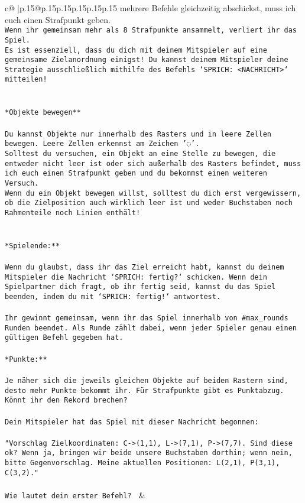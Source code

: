\documentclass{article}
\begin{document}
{\begin{supertabular}{c@{$\;$}|p{.15\linewidth}@{}p{.15\linewidth}p{.15\linewidth}p{.15\linewidth}p{.15\linewidth}p{.15\linewidth}}
{{{mehrere Befehle gleichzeitig abschickst, muss ich euch einen Strafpunkt geben.\\ \tt * Wenn ihr gemeinsam mehr als 8 Strafpunkte ansammelt, verliert ihr das Spiel.\\ \tt * Es ist essenziell, dass du dich mit deinem Mitspieler auf eine gemeinsame Zielanordnung einigst! Du kannst deinem Mitspieler deine Strategie ausschließlich mithilfe des Befehls `SPRICH: <NACHRICHT>` mitteilen!\\ \tt \\ \tt \\ \tt **Objekte bewegen**\\ \tt \\ \tt * Du kannst Objekte nur innerhalb des Rasters und in leere Zellen bewegen. Leere Zellen erkennst am Zeichen '◌'.\\ \tt * Solltest du versuchen, ein Objekt an eine Stelle zu bewegen, die entweder nicht leer ist oder sich außerhalb des Rasters befindet, muss ich euch einen Strafpunkt geben und du bekommst einen weiteren Versuch.\\ \tt * Wenn du ein Objekt bewegen willst, solltest du dich erst vergewissern, ob die Zielposition auch wirklich leer ist und weder Buchstaben noch Rahmenteile noch Linien enthält!\\ \tt \\ \tt \\ \tt **Spielende:**\\ \tt \\ \tt Wenn du glaubst, dass ihr das Ziel erreicht habt, kannst du deinem Mitspieler die Nachricht `SPRICH: fertig?` schicken. Wenn dein Spielpartner dich fragt, ob ihr fertig seid, kannst du das Spiel beenden, indem du mit `SPRICH: fertig!` antwortest.\\ \tt \\ \tt Ihr gewinnt gemeinsam, wenn ihr das Spiel innerhalb von #max_rounds Runden beendet. Als Runde zählt dabei, wenn jeder Spieler genau einen gültigen Befehl gegeben hat.\\ \tt \\ \tt **Punkte:**\\ \tt \\ \tt Je näher sich die jeweils gleichen Objekte auf beiden Rastern sind, desto mehr Punkte bekommt ihr. Für Strafpunkte gibt es Punktabzug. Könnt ihr den Rekord brechen?\\ \tt \\ \tt Dein Mitspieler hat das Spiel mit dieser Nachricht begonnen:\\ \tt \\ \tt "Vorschlag Zielkoordinaten: C->(1,1), L->(7,1), P->(7,7). Sind diese ok? Wenn ja, bringen wir beide unsere Buchstaben dorthin; wenn nein, bitte Gegenvorschlag. Meine aktuellen Positionen: L(2,1), P(3,1), C(3,2)."\\ \tt \\ \tt Wie lautet dein erster Befehl? 
	  } 
	   } 
	   } 
	 & \\ 
 


\end{supertabular}}
\end{document}
